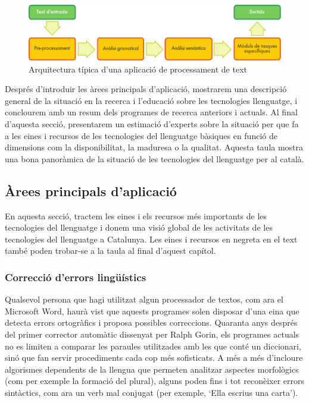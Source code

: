 \begin{multicols}{2}
\begin{figure}[b]
  \center
  \vspace{-5mm} \includegraphics[width=\textwidth]{../_media/catalan/text_processing_app_architecture}
  \caption{Arquitectura típica d'una aplicació de processament de text}
  \label{fig:textprocessingarch_ca}
\end{figure}

Després d’introduir les àrees principals d’aplicació, mostrarem una descripció general de la situació en la recerca i l’educació sobre les tecnologies llenguatge, i conclourem amb un resum dels programes de recerca anteriors i actuals. Al final d’aquesta secció, presentarem un estimació d’experts sobre la situació per que fa a les eines i recursos de les tecnologies del llenguatge bàsiques en funció de dimensions com la disponibilitat, la maduresa o la qualitat. Aquesta taula mostra una bona panoràmica de la situació de les tecnologies del llenguatge per al català.  

\subsection{Àrees principals d’aplicació} 

 En aquesta secció, tractem les eines i els recursos més importants de les tecnologies del llenguatge i 
  donem una visió global de les activitats de les tecnologies del llenguatge a Catalunya. Les eines i recursos en negreta en el text també poden trobar-se a la taula al final d'aquest capítol.

\subsubsection{Correcció d’errors lingüístics}

Qualsevol persona que hagi utilitzat algun processador de textos, com ara el Microsoft Word, haurà vist que aquests programes solen disposar d’una eina que detecta errors ortogràfics i proposa possibles correccions. Quaranta anys després del primer corrector automàtic dissenyat per Ralph Gorin, els programes actuals no es limiten a comparar les paraules utilitzades amb les que conté un diccionari, sinó que fan servir procediments cada cop més sofisticats. A més a més d’incloure algorismes dependents de la llengua que permeten analitzar aspectes morfològics (com per exemple la formació del plural), alguns poden fins i tot reconèixer errors sintàctics, com ara un verb mal conjugat (per exemple, ‘Ella escrius una carta’).


\end{multicols}
